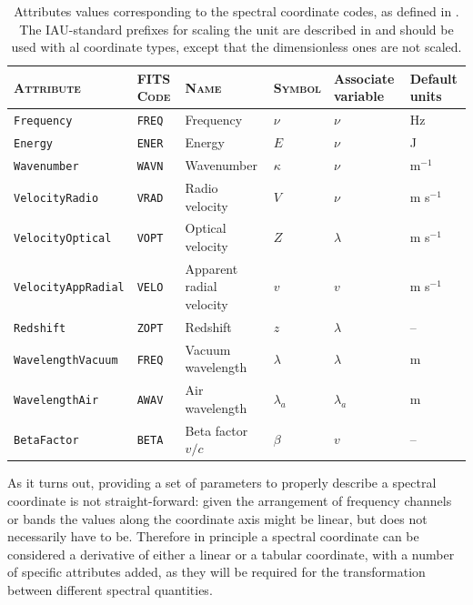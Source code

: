 \begin{table}[htb]
  \centering
  \begin{tabular}{lp{1.5cm}llp{1.5cm}p{1.5cm}}
    \hline
    \textsc{Attribute} & \textsc{FITS Code} & \textsc{Name} &
    \textsc{Symbol} & Associate variable & Default units \\
    \hline \hline
    \verb|Frequency|       & \verb|FREQ| & Frequency  & $\nu$ & $\nu$ & Hz \\
    \verb|Energy|          & \verb|ENER| & Energy     & $E$   & $\nu$ & J  \\
    \verb|Wavenumber|      & \verb|WAVN| & Wavenumber & $\kappa$ & $\nu$ & m$^{-1}$ \\
    \verb|VelocityRadio|   & \verb|VRAD| & Radio velocity & $V$ & $\nu$ & m s$^{-1}$ \\
    \verb|VelocityOptical| & \verb|VOPT| & Optical velocity & $Z$ & $\lambda$ & m s$^{-1}$ \\
    \verb|VelocityAppRadial| & \verb|VELO| & Apparent radial velocity & $v$ & $v$ & m s$^{-1}$ \\
    \verb|Redshift|        & \verb|ZOPT| & Redshift    & $z$ & $\lambda$ & -- \\
    \verb|WavelengthVacuum|& \verb|FREQ| & Vacuum wavelength & $\lambda$ & $\lambda$ & m \\
    \verb|WavelengthAir|   & \verb|AWAV| & Air wavelength  & $\lambda_a$ & $\lambda_a$ & m \\
    \verb|BetaFactor|      & \verb|BETA| & Beta factor $v/c$  & $\beta$ & $v$ & -- \\
    \hline
  \end{tabular}
  \caption{Attributes values corresponding to the spectral coordinate
    codes, as defined in \cite{fits.paper3}. The IAU-standard prefixes
    for scaling the unit are described in \cite{fits.paper1} and
    should be used with al coordinate types, except that the
    dimensionless ones are not scaled.}
  \label{tab:spectral coordinate codes}
\end{table}

As it turns out, providing a set of parameters to properly describe a spectral
coordinate is not straight-forward: given the arrangement of frequency channels
or bands the values along the coordinate axis might be linear, but
does not necessarily have to be. Therefore in principle a spectral
coordinate can be considered a derivative of either a linear or a
tabular coordinate, with a number of specific attributes added, as
they will be required for the transformation between different
spectral quantities.



